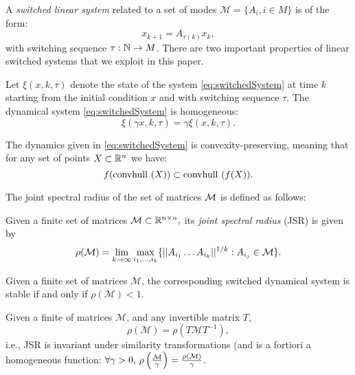A \emph{switched linear system} related to a set of modes $\mathcal{M}= \{A_i, i \in M \}$ is of the form:
\begin{equation}\label{eq:switchedSystem}x_{k+1} = A_{\tau(k)}x_k,\end{equation}
with switching sequence $\tau: \mathbb{N} \to M$. There are two important properties of linear switched systems that we exploit in this paper.
\begin{property}\label{property:homogeneity}
Let $\xi(x, k, \tau)$ denote the state of the system \eqref{eq:switchedSystem} at time $k$ starting from the initial condition $x$ and with switching sequence $\tau$. The dynamical system \eqref{eq:switchedSystem} is homogeneous:
$$\xi(\gamma x, k, \tau)= \gamma \xi(x, k, \tau). $$
\end{property}
\begin{property}\label{property:convpres}
The dynamics given in \eqref{eq:switchedSystem} is convexity-preserving, meaning that for any set of points $X \subset \mathbb{R}^n$ we have:
$$ f(\mbox{convhull }({X}))\subset \mbox{convhull }(f(X)). $$
\end{property}

The joint spectral radius of the set of matrices $\mathcal{M}$ is defined as follows:
\begin{definition} \cite{jungers_lncis} Given a finite set of matrices $\mathcal{M} \subset \mathbb{R}^{n\times n},$ its \emph{joint spectral radius} (JSR) is given by
$$\rho(\mathcal{M}) =\lim_{k\rightarrow \infty} \max_{i_1,\dots, i_k}\{||A_{i_1} \dots A_{i_k}||^{1/k}: A_{i_j}\in\mathcal{M}\}. $$
\end{definition}

\begin{property}
Given a finite set of matrices $\mathcal{M}$, the corresponding switched dynamical system is stable if and only if $\rho(\mathcal{M})<1$.
\end{property}

\begin{property}\label{rem:scaling}
Given a finite of matrices $\mathcal{M}$, and any invertible matrix $T$, 
$$\rho(\mathcal{M})=\rho(T \mathcal{M} T^{-1}),$$
i.e., JSR is invariant under similarity transformations (and is a fortiori a homogeneous function: $\forall \gamma > 0,\, \rho\left(\frac{\mathcal{M}}{\gamma}\right)=\frac{\rho(\mathcal{M})}{\gamma}$.
\end{property}


